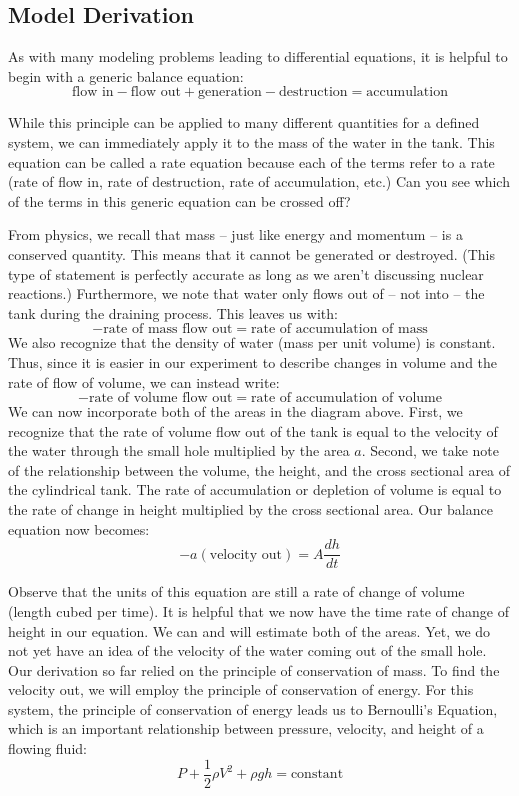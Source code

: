 \documentclass{ximera}
\begin{document}
\subsection*{Model Derivation}

As with many modeling problems leading to differential equations, it is helpful to begin with a generic balance equation:
$$\mbox{flow in}-\mbox{flow out}+\mbox{generation}-\mbox{destruction}=\mbox{accumulation}$$

While this principle can be applied to many different quantities for a defined system, we can immediately apply it to the mass of the water in the tank.  This equation can be called a rate equation because each of the terms refer to a rate (rate of flow in, rate of destruction, rate of accumulation, etc.)  Can you see which of the terms in this generic equation can be crossed off?  

From physics, we recall that mass – just like energy and momentum – is a conserved quantity.  This means that it cannot be generated or destroyed.  (This type of statement is perfectly accurate as long as we aren’t discussing nuclear reactions.)  Furthermore, we note that water only flows out of – not into – the tank during the draining process.  This leaves us with:
$$-\mbox{rate of mass flow out}=\mbox{rate of accumulation of mass}$$
We also recognize that the density of water (mass per unit volume) is constant.  Thus, since it is easier in our experiment to describe changes in volume and the rate of flow of volume, we can instead write:
$$-\mbox{rate of volume flow out}=\mbox{rate of accumulation of volume}$$
We can now incorporate both of the areas in the diagram above.  First, we recognize that the rate of volume flow out of the tank is equal to the velocity of the water through the small hole multiplied by the area $a$.  Second, we take note of the relationship between the volume, the height, and the cross sectional area of the cylindrical tank.  The rate of accumulation or depletion of volume is equal to the rate of change in height multiplied by the cross sectional area.  Our balance equation now becomes:
$$-a(\mbox{velocity out})=A\frac{dh}{dt}$$

Observe that the units of this equation are still a rate of change of volume (length cubed per time).  It is helpful that we now have the time rate of change of height in our equation.  We can and will estimate both of the areas.  Yet, we do not yet have an idea of the velocity of the water coming out of the small hole.  Our derivation so far relied on the principle of conservation of mass.  To find the velocity out, we will employ the principle of conservation of energy. 
For this system, the principle of conservation of energy leads us to Bernoulli’s Equation, which is an important relationship between pressure, velocity, and height of a flowing fluid:
$$P+\frac{1}{2}\rho V^2+\rho gh=\mbox{constant}$$
\end{document}
